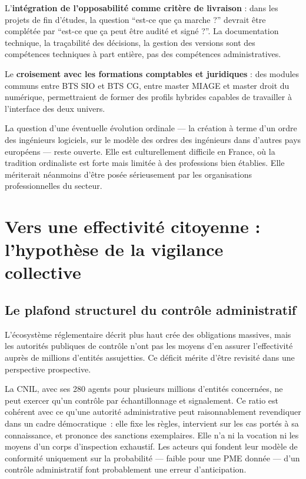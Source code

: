 \documentclass[12pt,a4paper]{article}
\begin{document}
L'\textbf{intégration de l'opposabilité comme critère de livraison} : dans les projets de fin d'études, la question \enquote{est-ce que ça marche ?} devrait être complétée par \enquote{est-ce que ça peut être audité et signé ?}. La documentation technique, la traçabilité des décisions, la gestion des versions sont des compétences techniques à part entière, pas des compétences administratives.

Le \textbf{croisement avec les formations comptables et juridiques} : des modules communs entre BTS SIO et BTS CG, entre master MIAGE et master droit du numérique, permettraient de former des profils hybrides capables de travailler à l'interface des deux univers.

La question d'une éventuelle évolution ordinale --- la création à terme d'un ordre des ingénieurs logiciels, sur le modèle des ordres des ingénieurs dans d'autres pays européens --- reste ouverte. Elle est culturellement difficile en France, où la tradition ordinaliste est forte mais limitée à des professions bien établies. Elle mériterait néanmoins d'être posée sérieusement par les organisations professionnelles du secteur.

\section{Vers une effectivité citoyenne : l'hypothèse de la vigilance collective}

\subsection{Le plafond structurel du contrôle administratif}

L'écosystème réglementaire décrit plus haut crée des obligations massives, mais les autorités publiques de contrôle n'ont pas les moyens d'en assurer l'effectivité auprès de millions d'entités assujetties. Ce déficit mérite d'être revisité dans une perspective prospective.

La CNIL, avec ses 280 agents pour plusieurs millions d'entités concernées, ne peut exercer qu'un contrôle par échantillonnage et signalement. Ce ratio est cohérent avec ce qu'une autorité administrative peut raisonnablement revendiquer dans un cadre démocratique~: elle fixe les règles, intervient sur les cas portés à sa connaissance, et prononce des sanctions exemplaires. Elle n'a ni la vocation ni les moyens d'un corps d'inspection exhaustif. Les acteurs qui fondent leur modèle de conformité uniquement sur la probabilité --- faible pour une PME donnée --- d'un contrôle administratif font probablement une erreur d'anticipation.
\end{document}
